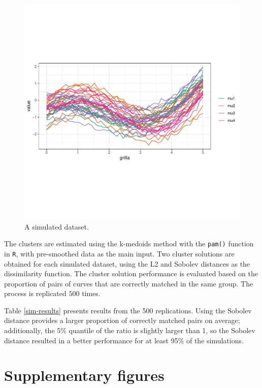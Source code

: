 \documentclass[smallextended,natbib]{svjour3}\usepackage[]{graphicx}\usepackage[]{xcolor}
\begin{document}
\begin{figure}[hbpt]
\centering
\includegraphics[trim=0cm 4cm 0cm 3cm, clip, scale=.6]{figures/fig-simstudy2.pdf}
\caption{ A simulated dataset. \label{dataset} }
\end{figure} 

The clusters are estimated using the k-medoids method with the \texttt{pam()} function in \texttt{R}, with pre-smoothed data as the main input. Two cluster solutions are obtained for each simulated dataset, 
using the L2 and Sobolev distances as the dissimilarity function. The cluster solution performance is evaluated based on the proportion of pairs of curves that are correctly matched in the same group. The process is replicated $500$ times. 

Table \ref{sim-results} presents results from the 500 replications. Using the Sobolev distance provides a larger proportion of correctly matched pairs on average; additionally, the 5\% quantile of the ratio is slightly larger than 1, so the Sobolev distance resulted in a better performance for at least 95\% of the simulations. 



\section{Supplementary figures}
\label{app:figsup}
\end{document}
